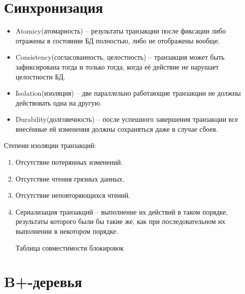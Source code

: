\documentclass[11pt]{article}
\begin{document}
\section{Синхронизация}
\label{sec:org605dd81}
\begin{itemize}
\item Atomicy(атомарность) -- результаты транзакции после фиксации либо отражены в состоянии БД полностью, либо не отображены вообще.
\item Consistency(согласованность, целостность) -- транзакция может быть зафиксирована тогда и только тогда, когда её действие не нарушает целостности БД.
\item Isolation(изоляция) -- две параллельно работающие транзакции не должны действовать одна на другую.
\item Durability(долговечность) -- после успешного завершения транзакции все внесённые ей изменения должны сохраняться даже в случае сбоев.
\end{itemize}

Степени изоляции транзакций:
\begin{enumerate}
\item Отсутствие потерянных изменений.
\item Отсутствие чтения грязных данных.
\item Отсутствие неповторяющихся чтений.
\item Сериализация транзакций -- выполнение их действий в таком порядке, результаты которого были бы такие же, как при последовательном их выполнении в некотором порядке.

Таблица совместимости блокировок
\end{enumerate}
\section{B+-деревья}
\label{sec:orge9261b8}
\end{document}
